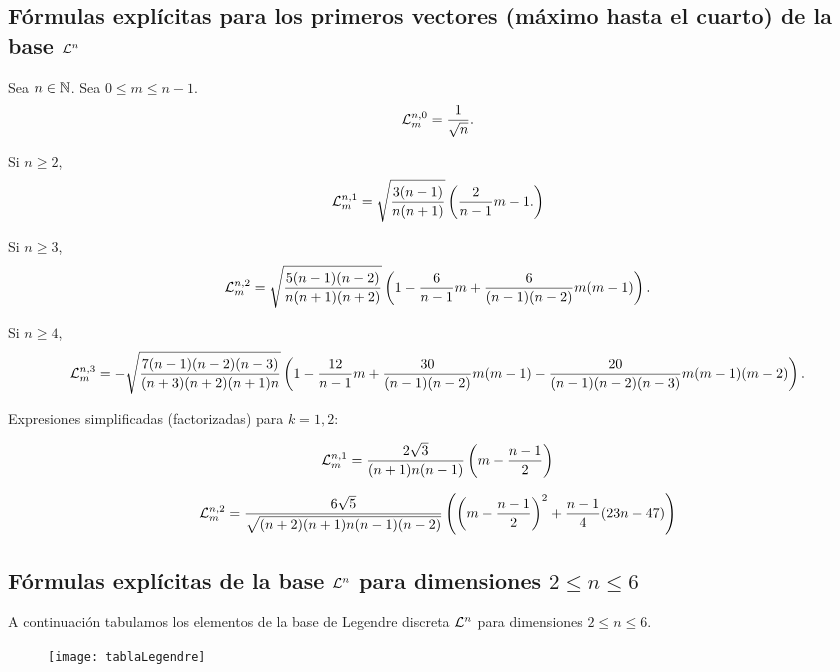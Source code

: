 \subsection{Fórmulas explícitas para los primeros vectores (máximo hasta el cuarto) de la base $\mathcal{L}^{n}$}

Sea $n \in \mathbb{N}$. Sea $0 \leq m \leq n-1$.
\[
\mathcal{L}^{n,0}_{m}=\frac{1}{\sqrt{n}}.
\]

Si $n \geq 2$,
\[
\mathcal{L}^{n,1}_{m}=\sqrt{\frac{3(n-1)}{n(n+1)}} \left( \frac{2}{n-1}m -1. \right)
\]

Si $n \geq 3$,
\[
\mathcal{L}^{n,2}_{m}=\sqrt{\frac{5(n-1)(n-2)}{n(n+1)(n+2)}} \left(1- \frac{6}{n-1}m + \frac{6}{(n-1)(n-2)}m(m-1) \right).
\]

Si $n \geq 4$,
\[
\mathcal{L}^{n,3}_{m}=-\sqrt{\frac{7(n-1)(n-2)(n-3)}{(n+3)(n+2)(n+1)n}}
\left( 1- \frac{12}{n-1}m + \frac{30}{(n-1)(n-2)}m(m-1)-
\frac{20}{(n-1)(n-2)(n-3)}m(m-1)(m-2) \right).
\]

\vspace{2cm}

Expresiones simplificadas (factorizadas) para $k=1,2$:

\[
\mathcal{L}^{n,1}_{m}=\frac{2\sqrt{3}}{(n+1)n(n-1)} \left( m-\frac{n-1}{2} \right)
\]

\[
\mathcal{L}^{n,2}_{m}=\frac{6\sqrt{5}}{\sqrt{(n+2)(n+1)n(n-1)(n-2)}} \left(
\left( m-\frac{n-1}{2} \right)^{2}+\frac{n-1}{4}(23n-47)
\right)
\]




\subsection{Fórmulas explícitas de la base $\mathcal{L}^{n}$ para dimensiones $2 \leq n \leq 6$} \label{subsect:Formulas explicitas}
\label{formulas explicitas para Ln con n de 2 hasta 6}

A continuación tabulamos los
elementos de la base de Legendre
discreta $\mathcal{L}^{n}$ para dimensiones
$2 \leq n \leq 6$.


\begin{figure}[H]
\centering\captionsetup{format = hang}
	\begin{measuredfigure}
		\texttt{[image: tablaLegendre]} 
		\caption{}
 	\end{measuredfigure}
 \end{figure}
 
